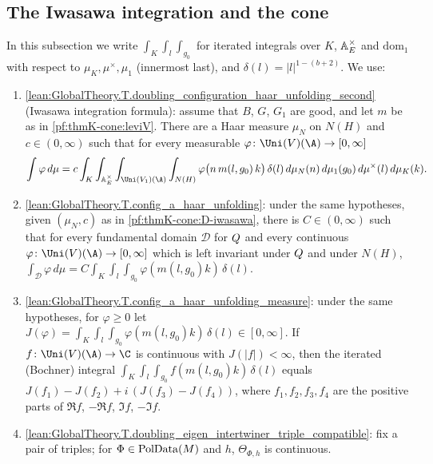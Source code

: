 \subsection{The Iwasawa integration and the cone}\label{pf:thmK-cone:iwasawa}

In this subsection we write $\int_K\int_l\int_{g_0}$ for iterated integrals over $K$, $\mathbb{A}_E^\times$ and
$\mathrm{dom}_1$ with respect to $\mu_K,\mu^\times,\mu_1$ (innermost last), and $\delta(l)=|l|^{1-(b+2)}$.  We use:
\begin{enumerate}[resume*=thmKconeD]
\item\label{pf:thmK-cone:D-iwasawa} \cref{lean:GlobalTheory.T.doubling_configuration_haar_unfolding_second} (Iwasawa
  integration formula): assume that $B$, $G$, $G_1$ are good, and let $m$ be as in \cref{pf:thmK-cone:leviV}.
  There are a Haar measure $\mu_N$ on $N(H)$ and $c\in(0,\infty)$ such that for every measurable
  $\varphi\colon\Uni(V)(\A)\to[0,\infty]$
  \[
    \int\varphi\,d\mu=c\int_K\int_{\thmKconeAE^\times}\int_{\Uni(V_1)(\A)}\int_{N(H)}
    \varphi\bigl(n\,m(l,g_0)\,k\bigr)\,\delta(l)\,d\mu_N(n)\,d\mu_1(g_0)\,d\mu^\times(l)\,d\mu_K(k).
  \]
\item\label{pf:thmK-cone:D-unfoldstab} \cref{lean:GlobalTheory.T.config_a_haar_unfolding}: under the same hypotheses,
  given $(\mu_N,c)$ as in \ref{pf:thmK-cone:D-iwasawa}, there is $C\in(0,\infty)$ such that for every fundamental domain
  $\mathcal D$ for $Q$ and every continuous $\varphi\colon\Uni(V)(\A)\to[0,\infty]$ which is left invariant under
  $Q$ and under $N(H)$,
  $\int_{\mathcal D}\varphi\,d\mu=C\int_K\int_l\int_{g_0}\varphi(m(l,g_0)k)\,\delta(l)$.
\item\label{pf:thmK-cone:D-four} \cref{lean:GlobalTheory.T.config_a_haar_unfolding_measure}: under the same hypotheses,
  for $\varphi\ge0$ let $J(\varphi)=\int_K\int_l\int_{g_0}\varphi(m(l,g_0)k)\,\delta(l)\in[0,\infty]$.  If
  $f\colon\Uni(V)(\A)\to\C$ is continuous with $J(|f|)<\infty$, then the iterated (Bochner) integral
  $\int_K\int_l\int_{g_0}f(m(l,g_0)k)\,\delta(l)$ equals $J(f_1)-J(f_2)+i\,(J(f_3)-J(f_4))$, where $f_1,f_2,f_3,f_4$ are
  the positive parts of $\Re f$, $-\Re f$, $\Im f$, $-\Im f$.
\item\label{pf:thmK-cone:D-cont} \cref{lean:GlobalTheory.T.doubling_eigen_intertwiner_triple_compatible}: fix a pair of
  triples; for $\Phi\in\operatorname{PolData}(M)$ and $h$, $\Theta_{\Phi,h}$ is continuous.

\end{enumerate}
